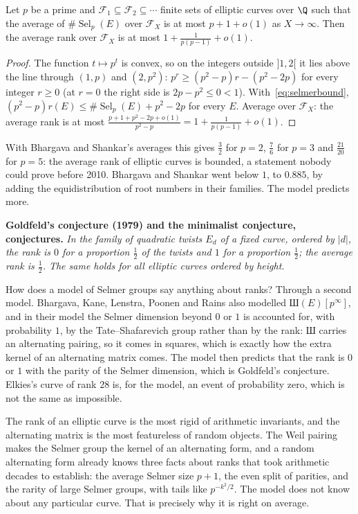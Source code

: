 \begin{proposition}\label{prop:avgrank}
Let $p$ be a prime and $\mathcal F_1\subseteq\mathcal F_2\subseteq\cdots$ finite sets of elliptic curves over $\Q$ such that the average of $\#\operatorname{Sel}_p(E)$ over $\mathcal F_X$ is at most $p+1+o(1)$ as $X\to\infty$. Then the average rank over $\mathcal F_X$ is at most $1+\frac1{p(p-1)}+o(1)$.
\end{proposition}
\begin{proof}
The function $t\mapsto p^t$ is convex, so on the integers outside $]1,2[$ it lies above the line through $(1,p)$ and $(2,p^2)$: $p^r\ge(p^2-p)r-(p^2-2p)$ for every integer $r\ge0$ (at $r=0$ the right side is $2p-p^2\le0<1$). With~\eqref{eq:selmerbound}, $(p^2-p)r(E)\le\#\operatorname{Sel}_p(E)+p^2-2p$ for every $E$. Average over $\mathcal F_X$: the average rank is at most $\frac{p+1+p^2-2p+o(1)}{p^2-p}=1+\frac1{p(p-1)}+o(1)$.
\end{proof}

With Bhargava and Shankar's averages this gives $\frac32$ for $p=2$, $\frac76$ for $p=3$ and $\frac{21}{20}$ for $p=5$: the average rank of elliptic curves is bounded, a statement nobody could prove before 2010. Bhargava and Shankar went below $1$, to $0.885$, by adding the equidistribution of root numbers in their families. The model predicts more.

\medskip\noindent\textbf{Goldfeld's conjecture (1979) and the minimalist conjecture, conjectures.} \emph{In the family of quadratic twists $E_d$ of a fixed curve, ordered by $|d|$, the rank is $0$ for a proportion $\frac12$ of the twists and $1$ for a proportion $\frac12$; the average rank is $\frac12$. The same holds for all elliptic curves ordered by height.}

\medskip
How does a model of Selmer groups say anything about ranks? Through a second model. Bhargava, Kane, Lenstra, Poonen and Rains also modelled $\text{Ш}(E)[p^\infty]$, and in their model the Selmer dimension beyond $0$ or $1$ is accounted for, with probability $1$, by the Tate--Shafarevich group rather than by the rank: $\text{Ш}$ carries an alternating pairing, so it comes in squares, which is exactly how the extra kernel of an alternating matrix comes. The model then predicts that the rank is $0$ or $1$ with the parity of the Selmer dimension, which is Goldfeld's conjecture. Elkies's curve of rank $28$ is, for the model, an event of probability zero, which is not the same as impossible.

\begin{beauty}
The rank of an elliptic curve is the most rigid of arithmetic invariants, and the alternating matrix is the most featureless of random objects. The Weil pairing makes the Selmer group the kernel of an alternating form, and a random alternating form already knows three facts about ranks that took arithmetic decades to establish: the average Selmer size $p+1$, the even split of parities, and the rarity of large Selmer groups, with tails like $p^{-k^2/2}$. The model does not know about any particular curve. That is precisely why it is right on average.
\end{beauty}

